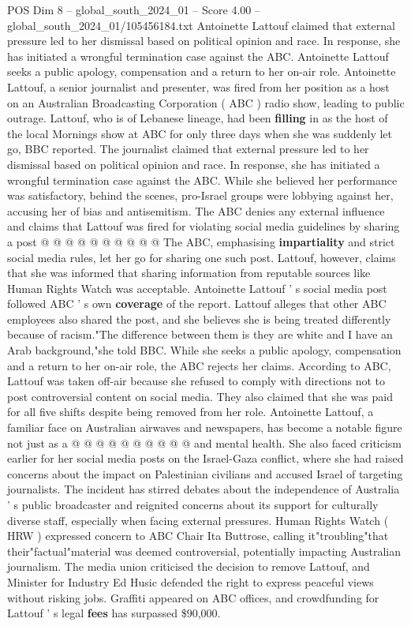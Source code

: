 \begin{textsample}{POS Dim 8 – global\_south\_2024\_01 – Score 4.00 – global\_south\_2024\_01/105456184.txt}  \label{ex:f8_pos_391}
Antoinette Lattouf claimed that external pressure led to her dismissal based on political opinion and race.
In response, she has initiated a wrongful termination case against the ABC.
Antoinette Lattouf seeks a public apology, compensation and a return to her on-air role.
Antoinette Lattouf, a senior journalist and presenter, was fired from her position as a host on an Australian Broadcasting Corporation ( ABC ) radio show, leading to public outrage.
Lattouf, who is of Lebanese lineage, had been \textbf{filling} in as the host of the local Mornings show at ABC for only three days when she was suddenly let go, BBC reported.
The journalist claimed that external pressure led to her dismissal based on political opinion and race.
In response, she has initiated a wrongful termination case against the ABC.
While she believed her performance was satisfactory, behind the scenes, pro-Israel groups were lobbying against her, accusing her of bias and antisemitism.
The ABC denies any external influence and claims that Lattouf was fired for violating social media guidelines by sharing a post @ @ @ @ @ @ @ @ @ @ The ABC, emphasising \textbf{impartiality} and strict social media rules, let her go for sharing one such post.
Lattouf, however, claims that she was informed that sharing information from reputable sources like Human Rights Watch was acceptable.
Antoinette Lattouf ' s social media post followed ABC ' s own \textbf{coverage} of the report.
Lattouf alleges that other ABC employees also shared the post, and she believes she is being treated differently because of racism."The difference between them is they are white and I have an Arab background,"she told BBC.
While she seeks a public apology, compensation and a return to her on-air role, the ABC rejects her claims.
According to ABC, Lattouf was taken off-air because she refused to comply with directions not to post controversial content on social media.
They also claimed that she was paid for all five shifts despite being removed from her role.
Antoinette Lattouf, a familiar face on Australian airwaves and newspapers, has become a notable figure not just as a @ @ @ @ @ @ @ @ @ @ and mental health.
She also faced criticism earlier for her social media posts on the Israel-Gaza conflict, where she had raised concerns about the impact on Palestinian civilians and accused Israel of targeting journalists.
The incident has stirred debates about the independence of Australia ' s public broadcaster and reignited concerns about its support for culturally diverse staff, especially when facing external pressures.
Human Rights Watch ( HRW ) expressed concern to ABC Chair Ita Buttrose, calling it"troubling"that their"factual"material was deemed controversial, potentially impacting Australian journalism.
The media union criticised the decision to remove Lattouf, and Minister for Industry Ed Husic defended the right to express peaceful views without risking jobs.
Graffiti appeared on ABC offices, and crowdfunding for Lattouf ' s legal \textbf{fees} has surpassed \$90,000.

\end{textsample}
